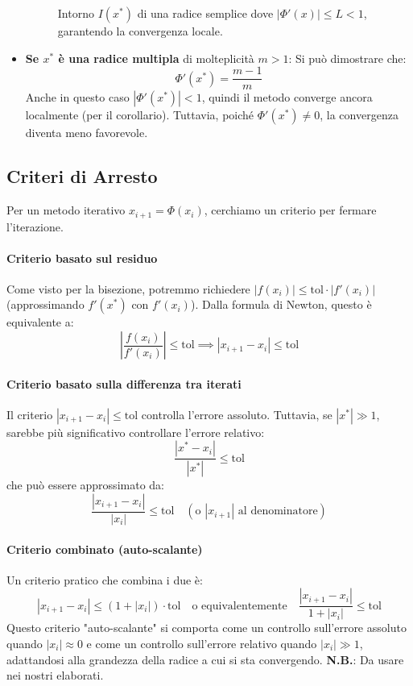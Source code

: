 \begin{itemize}
\begin{figure}[H]
    \caption{Intorno $I(x^*)$ di una radice semplice dove $|\Phi'(x)| \le L < 1$, garantendo la convergenza locale.}
    \label{fig:phi_derivata_newton}
    \end{figure}

    \item \textbf{Se $x^*$ è una radice multipla} di molteplicità $m > 1$: Si può dimostrare che:
    $$ \Phi'(x^*) = \frac{m-1}{m} $$
    Anche in questo caso $|\Phi'(x^*)| < 1$, quindi il metodo converge ancora localmente (per il corollario). Tuttavia, poiché $\Phi'(x^*) \neq 0$, la convergenza diventa meno favorevole.
\end{itemize}
\subsection{Criteri di Arresto}
Per un metodo iterativo $x_{i+1} = \Phi(x_i)$, cerchiamo un criterio per fermare l'iterazione.

\paragraph{Criterio basato sul residuo}
Come visto per la bisezione, potremmo richiedere $|f(x_i)| \le \text{tol} \cdot |f'(x_i)|$ (approssimando $f'(x^*)$ con $f'(x_i)$). Dalla formula di Newton, questo è equivalente a:
$$ \left| \frac{f(x_i)}{f'(x_i)} \right| \le \text{tol} \implies |x_{i+1} - x_i| \le \text{tol} $$

\paragraph{Criterio basato sulla differenza tra iterati}
Il criterio $|x_{i+1} - x_i| \le \text{tol}$ controlla l'errore assoluto. Tuttavia, se $|x^*| \gg 1$, sarebbe più significativo controllare l'errore relativo:
$$ \frac{|x^* - x_i|}{|x^*|} \le \text{tol} $$
che può essere approssimato da:
$$ \frac{|x_{i+1} - x_i|}{|x_i|} \le \text{tol} \quad (\text{o } |x_{i+1}| \text{ al denominatore}) $$

\paragraph{Criterio combinato (auto-scalante)}
Un criterio pratico che combina i due è:
$$ |x_{i+1} - x_i| \le (1 + |x_i|) \cdot \text{tol} \quad \text{o equivalentemente} \quad \frac{|x_{i+1} - x_i|}{1 + |x_i|} \le \text{tol} $$
Questo criterio "auto-scalante" si comporta come un controllo sull'errore assoluto quando $|x_i| \approx 0$ e come un controllo sull'errore relativo quando $|x_i| \gg 1$, adattandosi alla grandezza della radice a cui si sta convergendo. \textbf{N.B.}: Da usare nei nostri elaborati.